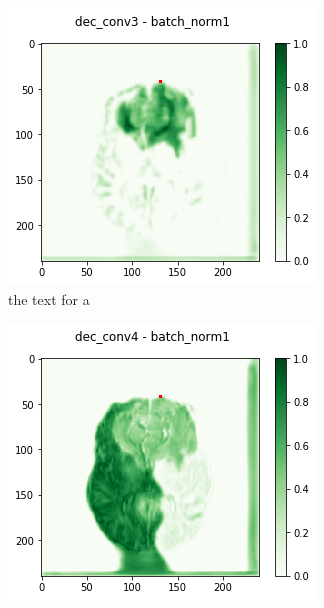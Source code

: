\begin{figure}[H]
    \centering
    \begin{subfigure}{.33\textwidth}
        \centering
        \includegraphics[width=\linewidth]{chapters/04_segmentation/images/grad_cam_30.png}
        \caption{ the text for a}
    \end{subfigure}%
    \begin{subfigure}{.33\textwidth}
        \centering
        \includegraphics[width=\linewidth]{chapters/04_segmentation/images/grad_cam_34.png}

\end{subfigure}
\end{figure}

